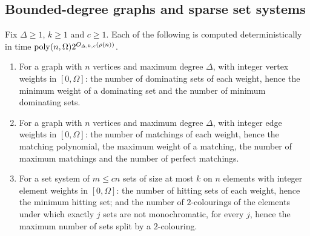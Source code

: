 \subsection{Bounded-degree graphs and sparse set systems}\label{ssec:bounded}
\begin{theorem}\label{thm:bounded}
Fix $\Delta\ge1$, $k\ge1$ and $c\ge1$. Each of the following is computed
deterministically in time $\operatorname{poly}(n,\Omega)2^{O_{\Delta,k,c}(\rho(n))}$.
\begin{enumerate}[label=(\roman*),leftmargin=2.2em]
\item\label{it:dom} For a graph with $n$ vertices and maximum degree $\Delta$,
with integer vertex weights in $[0,\Omega]$: the number of dominating sets of each
weight, hence the minimum weight of a dominating set and the number of minimum
dominating sets.
\item\label{it:match} For a graph with $n$ vertices and maximum degree $\Delta$,
with integer edge weights in $[0,\Omega]$: the number of matchings of each weight,
hence the matching polynomial, the maximum weight of a matching, the number of
maximum matchings and the number of perfect matchings.
\item\label{it:hit} For a set system of $m\le cn$ sets of size at most $k$ on $n$
elements with integer element weights in $[0,\Omega]$: the number of hitting
sets of each weight, hence the minimum hitting set; and the number of
$2$-colourings of the elements under which exactly $j$ sets are not
monochromatic, for every $j$, hence the maximum number of sets split by a
$2$-colouring.
\end{enumerate}
\end{theorem}

